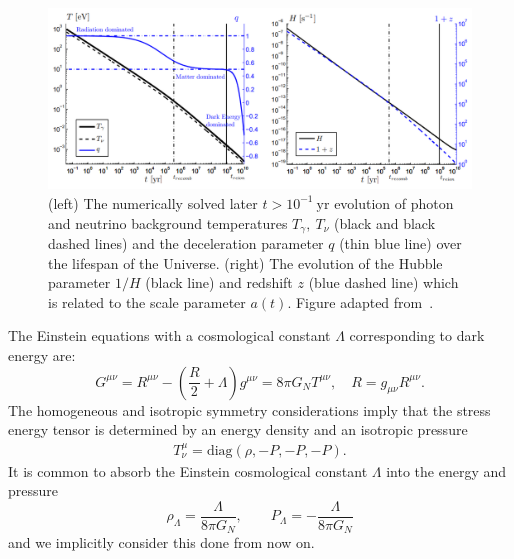 \documentclass[universe,article,submit,moreauthors,pdftex,a4paper]{Definitions/mdpi}
\newcommand{\beqn}{\begin{equation}}
\newcommand{\eeqn}{\end{equation}}
\begin{document}
\begin{figure}[ht]
 \centering
 \includegraphics[width=\textwidth]{./plots/deceleration_evolution.PNG}
 \caption{ (left) The numerically solved later $t>10^{-1}\ \mathrm{yr}$ evolution of photon and neutrino background temperatures $T_{\gamma},\ T_{\nu}$ (black and black dashed lines) and the deceleration parameter $q$ (thin blue line) over the lifespan of the Universe. (right) The evolution of the Hubble parameter $1/H$ (black line) and redshift $z$ (blue dashed line) which is related to the scale parameter $a(t)$. Figure adapted from~\cite{Rafelski:2013yka}.}
 \label{deceleration_evolution} 
\end{figure}

The Einstein equations with a cosmological constant $\Lambda$ corresponding to dark energy are:
\beqn\label{Einstein}
G^{\mu\nu}=R^{\mu\nu}-\left(\frac R 2 +\Lambda\right) g^{\mu\nu}=8\pi G_N T^{\mu\nu}, 
\quad R= g_{\mu\nu}R^{\mu\nu}.
\eeqn
The homogeneous and isotropic symmetry considerations imply that the stress energy tensor is determined by an energy density and an isotropic pressure
\begin{align}
 T^\mu_\nu =\mathrm{diag}(\rho, -P, -P, -P).
\end{align}
It is common to absorb the Einstein cosmological constant $\Lambda$ into the energy and pressure
\beqn\label{EpsLam}
\rho_\Lambda=\frac{\Lambda}{8\pi G_N}, \qquad P_\Lambda=-\frac{\Lambda}{8\pi G_N}
\eeqn
and we implicitly consider this done from now on.
\end{document}
